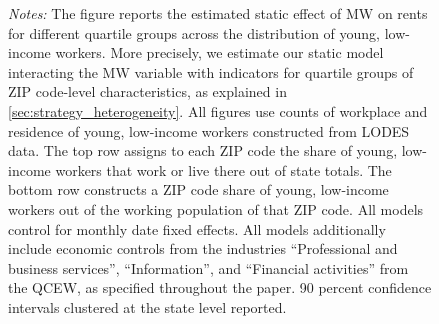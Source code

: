 \begin{figure}[htb!]
\begin{minipage}{0.95\textwidth}
		\vspace{3mm}	
		\textit{Notes:} The figure reports the estimated static effect of MW on rents for different 
		quartile groups across the distribution of young, low-income workers. More precisely, we estimate
		our static model interacting the MW variable with indicators for quartile groups of ZIP code-level 
		characteristics, as explained in \autoref{sec:strategy_heterogeneity}. All figures use counts of 
		workplace and residence of young, low-income workers constructed from LODES data. The top 
		row assigns to each ZIP code the share of young, low-income workers that work or live there out 
		of state totals. The bottom row constructs a ZIP code share of young, low-income workers out of 
		the working population of that ZIP code. All models control for monthly date fixed effects. All 
		models additionally include economic controls from the industries ``Professional and business 
		services'', ``Information'', and ``Financial activities'' from the QCEW, as specified throughout
		the paper. 90 percent confidence intervals clustered at the state level reported. 
	\end{minipage}
\end{figure}

